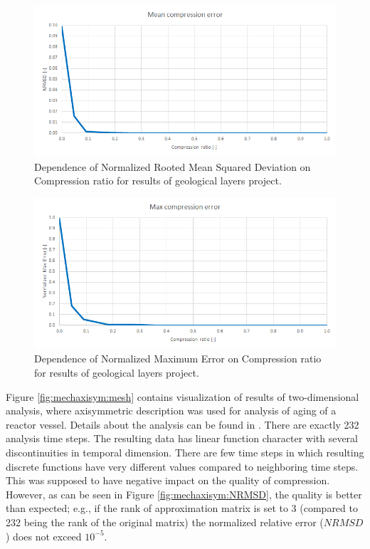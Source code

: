 \begin{figure}[H]
\centering\includegraphics[width=\textwidth]{figures/chotkova_NRMSD}
\caption{Dependence of Normalized Rooted Mean Squared Deviation on Compression ratio for results of geological layers project.}
\label{fig:chotkova:NRMSD}
\end{figure}

\begin{figure}[H]
\centering\includegraphics[width=\textwidth]{figures/chotkova_MaxError}
\caption{Dependence of Normalized Maximum Error on Compression ratio for results of geological layers project.}
\label{fig:chotkova:MaxError}
\end{figure}

Figure \ref{fig:mechaxisym:mesh} contains visualization of results of two-dimensional analysis, where axisymmetric description was used for analysis of aging of a reactor vessel. Details about the analysis can be found in \cite{Kruis2005}. There are exactly 232 analysis time steps. The resulting data has linear function character with several discontinuities in temporal dimension. There are few time steps in which resulting discrete functions have very different values compared to neighboring time steps. This was supposed to have negative impact on the quality of compression. However, as can be seen in Figure \ref{fig:mechaxisym:NRMSD}, the quality is better than expected; e.g., if the rank of approximation matrix is set to 3 (compared to 232 being the rank of the original matrix) the normalized relative error ($\mathit{NRMSD}$) does not exceed $10^{-5}$.

